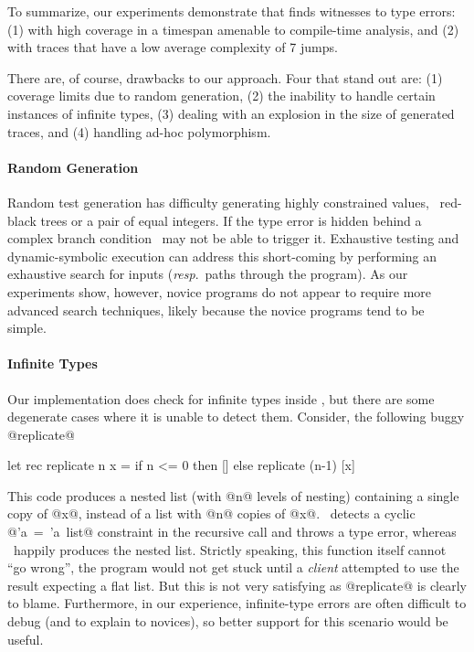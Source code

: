 To summarize, our experiments demonstrate that \nanomaly finds witnesses
to type errors: (1) with high coverage in a timespan amenable to
compile-time analysis, and (2) with traces that have a low average
complexity of 7 jumps.

There are, of course, drawbacks to our approach. Four that stand out
are: (1) coverage limits due to random generation, (2) the inability to
handle certain instances of infinite types, (3) dealing with an
explosion in the size of generated traces, and (4) handling ad-hoc
polymorphism.

\paragraph{Random Generation}
Random test generation has difficulty generating highly constrained
values, \eg\ red-black trees or a pair of equal integers. If the type
error is hidden behind a complex branch condition \nanomaly\ may not be
able to trigger it. Exhaustive testing and dynamic-symbolic execution
can address this short-coming by performing an exhaustive search for
inputs (\emph{resp}.\ paths through the program). As our experiments
show, however, novice programs do not appear to require more advanced
search techniques, likely because the novice programs tend to be simple.

\paragraph{Infinite Types}
Our implementation does check for infinite types inside \forcesym, but
there are some degenerate cases where it is unable to detect
them. Consider, the following buggy @replicate@
%
\begin{code}
  let rec replicate n x =
    if n <= 0 then []
              else replicate (n-1) [x]
\end{code}
%
This code produces a nested list (with @n@ levels of nesting) containing
a single copy of @x@, instead of a list with @n@ copies of @x@. \ocaml\
detects a cyclic \hbox{@'a = 'a list@} constraint in the recursive call
and throws a type error, whereas \nanomaly\ happily %
produces the nested list.  Strictly speaking, this function itself cannot
``go wrong'', the program would not get stuck until a \emph{client}
attempted to use the result expecting a flat list. But this is not very
satisfying as @replicate@ is clearly to blame. Furthermore, in our
experience, infinite-type errors are often difficult to %
debug (and to explain to novices), so better support for this scenario
would be useful.

